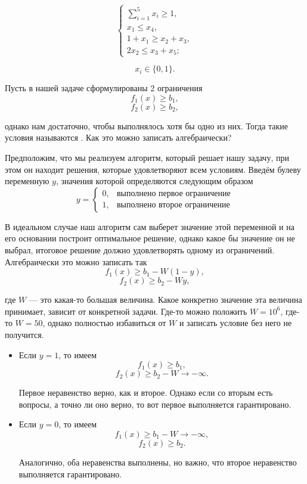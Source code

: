 \[
	\begin{cases}
		\sum\limits_{i=1}^{5} x_i \ge 1, \\
		x_1 \le x_4, \\
		1 + x_1 \ge x_2 + x_3, \\
		2x_2 \le x_3 + x_5;
	\end{cases}
\]

\[
	x_i \in \{0, 1\}.
\]

\label{fact:alternative_conditions}

Пусть в нашей задаче сформулированы 2 ограничения
\[f_1(x) \ge b_1,\]
\[f_2(x) \ge b_2,\]

однако нам достаточно, чтобы выполнялось хотя бы одно из них. Тогда такие условия называются . Как это можно записать алгебраически?

Предположим, что мы реализуем алгоритм, который решает нашу задачу, при этом он находит решения, которые удовлетворяют всем условиям. Введём булеву переменную $y$, значения которой определяются следующим образом 
\[
	y = \begin{cases}
		0,& \text{выполнено первое ограничение}\\
		1,&\text{выполнено второе ограничение}
	\end{cases}
\]

В идеальном случае наш алгоритм сам выберет значение 
этой переменной и на его основании построит оптимальное решение, однако какое бы значение он не выбрал, итоговое решение должно удовлетворять одному из ограничений. Алгебраически это можно записать так
\[f_1(x) \ge b_1 - W(1-y),\]
\[f_2(x) \ge b_2 - Wy,\]

где $W$ --- это какая-то большая величина. Какое конкретно значение эта величина принимает, зависит от конкретной задачи. Где-то можно положить $W = 10^6$, где-то $W = 50$, однако полностью избавиться от $W$ и записать условие без него не получится.

\begin{itemize}[nosep]
	\item Если $y = 1$, то имеем
	\[f_1(x) \ge b_1,\]
	\[f_2(x) \ge b_2 - W \to -\infty.\]
	
	Первое неравенство верно, как и второе. Однако если со вторым есть вопросы, а точно ли оно верно, то вот первое выполняется гарантировано.
	
	\item Если $y = 0$, то имеем
	\[f_1(x) \ge b_1 - W \to -\infty,\]
	\[f_2(x) \ge b_2.\]
	
	Аналогично, оба неравенства выполнены, но важно, что второе неравенство выполняется гарантировано.
	
\end{itemize}

